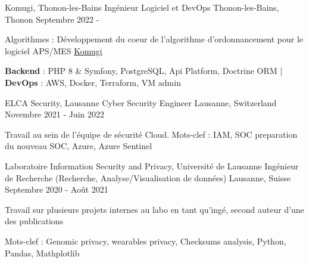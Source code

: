 


\begin{cventries}
	
	\cventry
	{Komugi, Thonon-les-Bains} %
	{Ingénieur Logiciel et DevOps} %
	{Thonon-les-Bains, Thonon} %
	{Septembre 2022 - } %
	{ %
		\begin{cvitems}
			\item {Algorithmes : Développement du coeur de l'algorithme d'ordonnancement pour le logiciel APS/MES \href{https://www.komugi.io/fr/}{Komugi}}
			\item {\textbf{Backend} : PHP 8 \& Symfony, PostgreSQL, Api Platform, Doctrine ORM | \textbf{DevOps} : AWS, Docker, Terraform, VM admin}
		\end{cvitems}
	}
	
	\cventry
	{ELCA Security, Lausanne} %
	{Cyber Security Engineer} %
	{Lausanne, Switzerland} %
	{Novembre 2021 - Juin 2022} %
	{ %
		\begin{cvitems}
			\item {Travail au sein de l'équipe de sécurité Cloud. Mots-clef : IAM, SOC preparation du nouveau SOC, Azure, Azure Sentinel}
		\end{cvitems}
	}
	
	\cventry
	{Laboratoire Information Security and Privacy, Université de Lausanne} %
	{Ingénieur de Recherche (Recherche, Analyse/Visualisation de données)} %
	{Lausanne, Suisse} %
	{Septembre 2020 - Août 2021} %
	{ %
		\begin{cvitems}
			\item {Travail sur plusieurs projets internes au labo en tant qu'ingé, second auteur d'une des publications}
			\item {Mots-clef : Genomic privacy, wearables privacy, Checksums analysis, Python, Pandas, Mathplotlib}
		\end{cvitems}
	}
	

\end{cventries}

